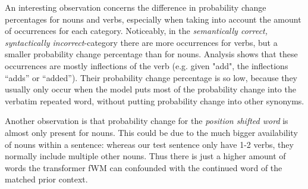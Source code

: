 An interesting observation concerns the difference in probability change percentages for nouns and verbs, especially when taking into account the amount of occurrences for each category.
Noticeably, in the \textit{semantically correct, syntactically incorrect}-category there are more occurrences for verbs, but a smaller probability change percentage than for nouns.
Analysis shows that these occurrences are mostly inflections of the verb (e.g. given "add", the inflections ``adds'' or ``added''). Their probability change percentage is so low, because they usually only occur when the model puts most of the probability change into the verbatim repeated word, without putting probability change into other synonyms.

Another observation is that probability change for the \textit{position shifted word} is almost only present for nouns.
This could be due to the much bigger availability of nouns within a sentence:
whereas our test sentence only have 1-2 verbs, they normally include multiple other nouns.
Thus there is just a higher amount of words the transformer fWM can confounded with the continued word of the matched prior context.

\newpage
